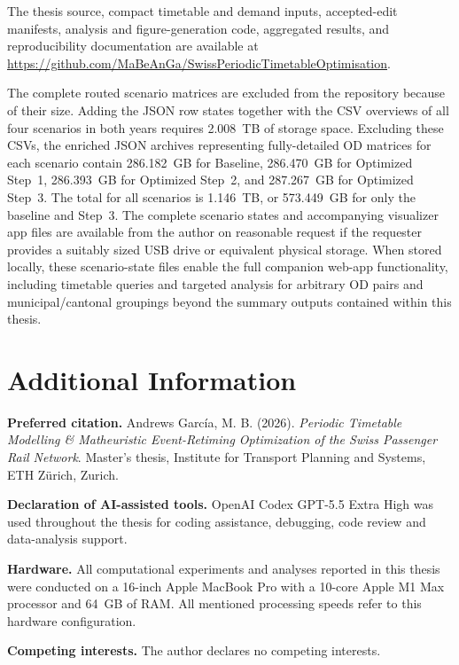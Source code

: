 \documentclass[preprint,12pt]{elsarticle}
\begin{document}
The thesis source, compact timetable and demand inputs, accepted-edit manifests, analysis and figure-generation code, aggregated results, and reproducibility documentation are available at \url{https://github.com/MaBeAnGa/SwissPeriodicTimetableOptimisation}.

The complete routed scenario matrices are excluded from the repository because of their size. Adding the JSON row states together with the CSV overviews of all four scenarios in both years requires 2.008~TB of storage space. Excluding these CSVs, the enriched JSON archives representing fully-detailed OD matrices for each scenario contain 286.182~GB for Baseline, 286.470~GB for Optimized Step~1, 286.393~GB for Optimized Step~2, and 287.267~GB for Optimized Step~3. The total for all scenarios is 1.146~TB, or 573.449~GB for only the baseline and Step~3. The complete scenario states and accompanying visualizer app files are available from the author on reasonable request if the requester provides a suitably sized USB drive or equivalent physical storage. When stored locally, these scenario-state files enable the full companion web-app functionality, including timetable queries and targeted analysis for arbitrary OD pairs and municipal/cantonal groupings beyond the summary outputs contained within this thesis.

\section*{Additional Information}

\textbf{Preferred citation.}
Andrews García, M. B. (2026). \textit{Periodic Timetable Modelling \& Matheuristic Event-Retiming Optimization of the Swiss Passenger Rail Network}. Master's thesis, Institute for Transport Planning and Systems, ETH Zürich, Zurich.

\textbf{Declaration of AI-assisted tools.}
OpenAI Codex GPT-5.5 Extra High was used throughout the thesis for coding assistance, debugging, code review and data-analysis support.

\textbf{Hardware.}
All computational experiments and analyses reported in this thesis were conducted on a 16-inch Apple MacBook Pro with a 10-core Apple M1 Max processor and 64~GB of RAM. All mentioned processing speeds refer to this hardware configuration.

\textbf{Competing interests.}
The author declares no competing interests.
\end{document}

